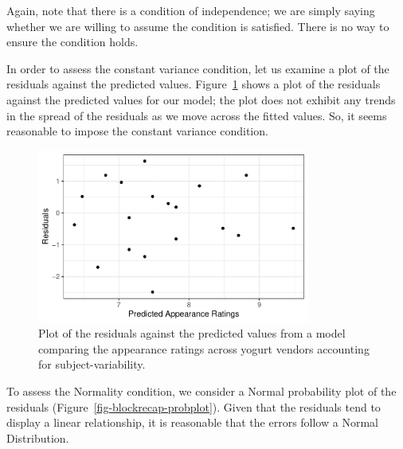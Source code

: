 \documentclass[
  letterpaper,
  DIV=11,
  numbers=noendperiod]{scrreprt}
\theoremstyle{plain}
\theoremstyle{definition}
\theoremstyle{definition}
\theoremstyle{remark}
\begin{document}
Again, note that there is a condition of independence; we are simply
saying whether we are willing to assume the condition is satisfied.
There is no way to ensure the condition holds.

In order to assess the constant variance condition, let us examine a
plot of the residuals against the predicted values.
Figure~\ref{fig-blockrecap-resids} shows a plot of the residuals against
the predicted values for our model; the plot does not exhibit any trends
in the spread of the residuals as we move across the fitted values. So,
it seems reasonable to impose the constant variance condition.

\begin{figure}

{\centering \includegraphics[width=0.8\textwidth,height=\textheight]{./images/fig-blockrecap-resids-1.pdf}

}

\caption{\label{fig-blockrecap-resids}Plot of the residuals against the
predicted values from a model comparing the appearance ratings across
yogurt vendors accounting for subject-variability.}

\end{figure}

To assess the Normality condition, we consider a Normal probability plot
of the residuals (Figure~\ref{fig-blockrecap-probplot}). Given that the
residuals tend to display a linear relationship, it is reasonable that
the errors follow a Normal Distribution.
\end{document}
